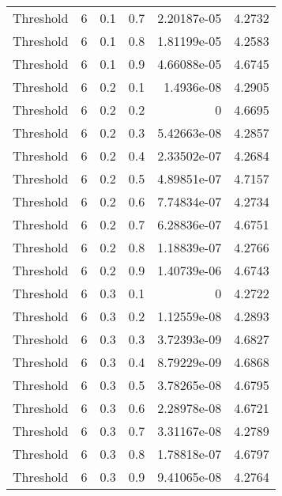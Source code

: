 \documentclass{article}
\begin{document}
\begin{longtable}[H]{lrrrrr}
 Threshold      &       6 &   0.1 &            0.7 &   2.20187e-05 &          4.2732 \\
 Threshold      &       6 &   0.1 &            0.8 &   1.81199e-05 &          4.2583 \\
 Threshold      &       6 &   0.1 &            0.9 &   4.66088e-05 &          4.6745 \\
 Threshold      &       6 &   0.2 &            0.1 &   1.4936e-08  &          4.2905 \\
 Threshold      &       6 &   0.2 &            0.2 &   0           &          4.6695 \\
 Threshold      &       6 &   0.2 &            0.3 &   5.42663e-08 &          4.2857 \\
 Threshold      &       6 &   0.2 &            0.4 &   2.33502e-07 &          4.2684 \\
 Threshold      &       6 &   0.2 &            0.5 &   4.89851e-07 &          4.7157 \\
 Threshold      &       6 &   0.2 &            0.6 &   7.74834e-07 &          4.2734 \\
 Threshold      &       6 &   0.2 &            0.7 &   6.28836e-07 &          4.6751 \\
 Threshold      &       6 &   0.2 &            0.8 &   1.18839e-07 &          4.2766 \\
 Threshold      &       6 &   0.2 &            0.9 &   1.40739e-06 &          4.6743 \\
 Threshold      &       6 &   0.3 &            0.1 &   0           &          4.2722 \\
 Threshold      &       6 &   0.3 &            0.2 &   1.12559e-08 &          4.2893 \\
 Threshold      &       6 &   0.3 &            0.3 &   3.72393e-09 &          4.6827 \\
 Threshold      &       6 &   0.3 &            0.4 &   8.79229e-09 &          4.6868 \\
 Threshold      &       6 &   0.3 &            0.5 &   3.78265e-08 &          4.6795 \\
 Threshold      &       6 &   0.3 &            0.6 &   2.28978e-08 &          4.6721 \\
 Threshold      &       6 &   0.3 &            0.7 &   3.31167e-08 &          4.2789 \\
 Threshold      &       6 &   0.3 &            0.8 &   1.78818e-07 &          4.6797 \\
 Threshold      &       6 &   0.3 &            0.9 &   9.41065e-08 &          4.2764 \\

\end{longtable}
\end{document}

